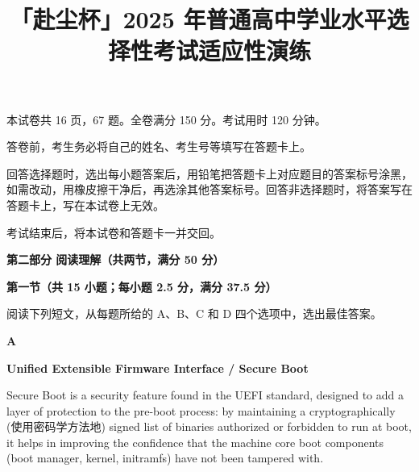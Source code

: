 \documentclass{exam-zh}
\title{「赴尘杯」2025 年普通高中学业水平选择性考试适应性演练}
\begin{document}

\vspace{1\baselineskip}

\secret

\maketitle

本试卷共 16 页，67 题。全卷满分 150 分。考试用时 120 分钟。

\begin{notice}[][itemsep=0pt, parsep=0pt, topsep=0pt, partopsep=0pt]
\item 答卷前，考生务必将自己的姓名、考生号等填写在答题卡上。
\item 回答选择题时，选出每小题答案后，用铅笔把答题卡上对应题目的答案标号涂黑，如需改动，用橡皮擦干净后，再选涂其他答案标号。回答非选择题时，将答案写在答题卡上，写在本试卷上无效。
\item 考试结束后，将本试卷和答题卡一并交回。
\end{notice}


\begin{flushleft}
  {\bfseries 第二部分 \hspace{0.5em} 阅读理解（共两节，满分 50 分）}

{\bfseries 第一节（共 15 小题；每小题 2.5 分，满分 37.5 分）}
\end{flushleft}

阅读下列短文，从每题所给的 A、B、C 和 D 四个选项中，选出最佳答案。

{\centering \bfseries A \par}

{\centering \bfseries Unified Extensible Firmware Interface / Secure Boot \par}

Secure Boot is a security feature found in the UEFI standard, designed to add a layer of protection to the pre-boot process: by maintaining a cryptographically (使用密码学方法地) signed list of binaries authorized or forbidden to run at boot, it helps in improving the confidence that the machine core boot components (boot manager, kernel, initramfs) have not been tampered with.
\end{document}
